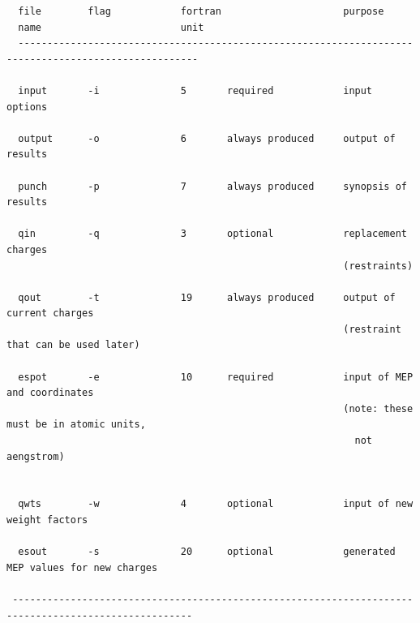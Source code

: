\documentclass[a4paper]{article}
\begin{document}
\begin{tcolorbox}
\begin{verbatim}
  file        flag            fortran                     purpose
  name                        unit
  -----------------------------------------------------------------------------------------------------
  
  input       -i              5       required            input options
  
  output      -o              6       always produced     output of results
  
  punch       -p              7       always produced     synopsis of results
  
  qin         -q              3       optional            replacement charges 
                                                          (restraints)
  
  qout        -t              19      always produced     output of current charges 
                                                          (restraint that can be used later)
  
  espot       -e              10      required            input of MEP and coordinates
                                                          (note: these must be in atomic units, 
                                                            not aengstrom)
  
  
  qwts        -w              4       optional            input of new weight factors
  
  esout       -s              20      optional            generated MEP values for new charges
  
 -----------------------------------------------------------------------------------------------------
\end{verbatim}
\end{tcolorbox}
\end{document}
